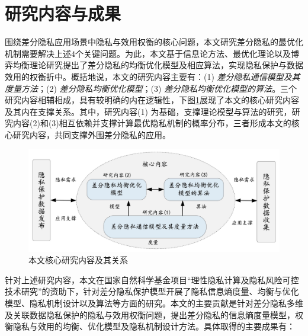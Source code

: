 \section{研究内容与成果}
围绕差分隐私应用场景中隐私与效用权衡的核心问题，本文研究差分隐私的最优化机制需要解决上述$4$个关键问题。为此，本文基于信息论方法、最优化理论以及博弈均衡理论研究提出了差分隐私的均衡优化模型及相应算法，实现隐私保护与数据效用的权衡折中。概括地说，本文的研究内容主要有：(1) {\em 差分隐私通信模型及其度量方法}；(2) {\em 差分隐私均衡优化模型}；(3) {\em 差分隐私均衡优化模型的算法}。三个研究内容相辅相成，具有较明确的内在逻辑性，下图\ref{fig:chapter1-research-relation}展现了本文的核心研究内容及其内在支撑关系。其中，研究内容(1) 为基础，支撑理论模型与算法的研究，研究内容(2)和(3)相互依赖并支撑计算最优隐私机制的概率分布，三者形成本文的核心研究内容，共同支撑外围差分隐私的应用。
\begin{figure}[htbp]
	\centering
	\includegraphics[width = 0.8\linewidth]{./figures/chapter01_1.jpg}
	\caption{本文核心研究内容及其关系}
	\label{fig:chapter1-research-relation}
\end{figure}

针对上述研究内容，本文在国家自然科学基金项目``理性隐私计算及隐私风险可控技术研究''的资助下，针对差分隐私保护模型开展了隐私信息熵度量、均衡与优化模型、隐私机制设计以及算法等方面的研究。本文的主要贡献是针对差分隐私多维及关联数据隐私保护的隐私与效用权衡问题，提出差分隐私的信息熵度量模型，权衡隐私与效用的均衡、优化模型及隐私机制设计方法。具体取得的主要成果有：
%
%

